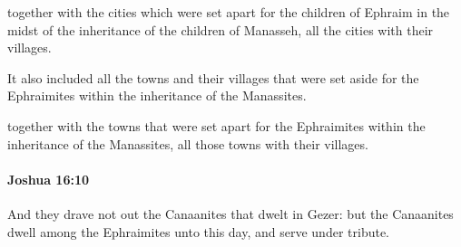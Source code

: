 			\begin{versebox}
					\item[BHS] 
					\item[ASV] together with the cities which were set apart for the children of Ephraim in the midst of the inheritance of the children of Manasseh, all the cities with their villages.
					\item[NIV] It also included all the towns and their villages that were set aside for the Ephraimites within the inheritance of the Manassites.
					\item[NRSV] together with the towns that were set apart for the Ephraimites within the inheritance of the Manassites, all those towns with their villages.
			\end{versebox}

		\paragraph{Joshua 16:10} %
			\label{JOSHUA-16-10}

			And they drave not out the Canaanites that dwelt in Gezer: but the Canaanites dwell among the Ephraimites unto this day, and serve under tribute.

